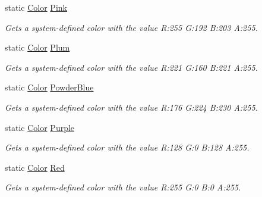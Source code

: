 \begin{DoxyCompactItemize}
static \hyperlink{struct_microsoft_1_1_xna_1_1_framework_1_1_color}{Color} \hyperlink{struct_microsoft_1_1_xna_1_1_framework_1_1_color_a2ca63ead2de502e2ffb14275c54ac127}{Pink}
\begin{DoxyCompactList}\small\item\em Gets a system-\/defined color with the value R\+:255 G\+:192 B\+:203 A\+:255.\end{DoxyCompactList}\item 
static \hyperlink{struct_microsoft_1_1_xna_1_1_framework_1_1_color}{Color} \hyperlink{struct_microsoft_1_1_xna_1_1_framework_1_1_color_a0faca7349305c3a5ba251f72cf5e4416}{Plum}
\begin{DoxyCompactList}\small\item\em Gets a system-\/defined color with the value R\+:221 G\+:160 B\+:221 A\+:255.\end{DoxyCompactList}\item 
static \hyperlink{struct_microsoft_1_1_xna_1_1_framework_1_1_color}{Color} \hyperlink{struct_microsoft_1_1_xna_1_1_framework_1_1_color_ac0eb908d8740df4434a60529dc56785a}{Powder\+Blue}
\begin{DoxyCompactList}\small\item\em Gets a system-\/defined color with the value R\+:176 G\+:224 B\+:230 A\+:255.\end{DoxyCompactList}\item 
static \hyperlink{struct_microsoft_1_1_xna_1_1_framework_1_1_color}{Color} \hyperlink{struct_microsoft_1_1_xna_1_1_framework_1_1_color_a689bbaa13f7e43b7daca8a39233d4034}{Purple}
\begin{DoxyCompactList}\small\item\em Gets a system-\/defined color with the value R\+:128 G\+:0 B\+:128 A\+:255.\end{DoxyCompactList}\item 
static \hyperlink{struct_microsoft_1_1_xna_1_1_framework_1_1_color}{Color} \hyperlink{struct_microsoft_1_1_xna_1_1_framework_1_1_color_aeba4f4f8f29105c08df992c7de2e5466}{Red}
\begin{DoxyCompactList}\small\item\em Gets a system-\/defined color with the value R\+:255 G\+:0 B\+:0 A\+:255.\end{DoxyCompactList}\item 

\end{DoxyCompactItemize}
